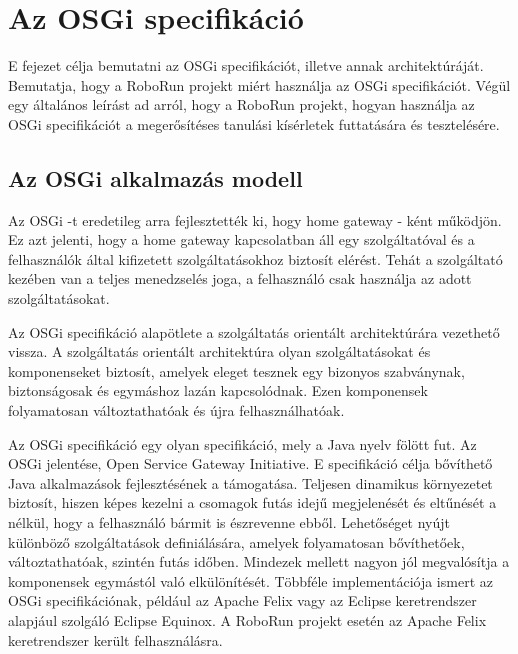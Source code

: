 \chapter{Az OSGi specifikáció}\label{ch:OSGI}

\begin{osszefoglal}
	E fejezet célja bemutatni az OSGi specifikációt, illetve annak architektúráját. Bemutatja, hogy a RoboRun projekt miért használja az OSGi specifikációt. Végül egy általános leírást ad arról, hogy a RoboRun projekt, hogyan használja az OSGi specifikációt a megerősítéses tanulási kísérletek futtatására és tesztelésére.
\end{osszefoglal}


\section{Az OSGi alkalmazás modell}\label{sec:OSGI_alkalmazasModell}
Az OSGi -t eredetileg arra fejlesztették ki, hogy home gateway - ként működjön. Ez azt jelenti, hogy a home gateway kapcsolatban áll egy szolgáltatóval és a felhasználók által kifizetett szolgáltatásokhoz biztosít elérést. Tehát a szolgáltató kezében  van a teljes menedzselés joga, a felhasználó csak használja az adott szolgáltatásokat. 
	
Az OSGi specifikáció alapötlete a szolgáltatás orientált architektúrára\cite{szolg} vezethető vissza. A szolgáltatás orientált architektúra olyan szolgáltatásokat és komponenseket biztosít, amelyek eleget tesznek egy bizonyos szabványnak, biztonságosak és egymáshoz lazán kapcsolódnak. Ezen komponensek folyamatosan változtathatóak és újra felhasználhatóak.

Az OSGi specifikáció egy olyan specifikáció, mely a Java nyelv fölött fut. Az OSGi jelentése, Open Service Gateway Initiative. E specifikáció célja bővíthető Java alkalmazások fejlesztésének a támogatása. Teljesen dinamikus környezetet biztosít, hiszen képes kezelni a csomagok futás idejű megjelenését és eltűnését a nélkül, hogy a felhasználó bármit is észrevenne ebből. Lehetőséget nyújt különböző szolgáltatások definiálására, amelyek folyamatosan bővíthetőek, változtathatóak, szintén futás időben. Mindezek mellett nagyon jól megvalósítja a komponensek egymástól való elkülönítését. Többféle implementációja ismert az OSGi specifikációnak, például az Apache Felix\cite{apache} vagy az Eclipse keretrendszer alapjául szolgáló Eclipse Equinox\cite{equinox}. A RoboRun projekt esetén az Apache Felix keretrendszer került felhasználásra.
	   

